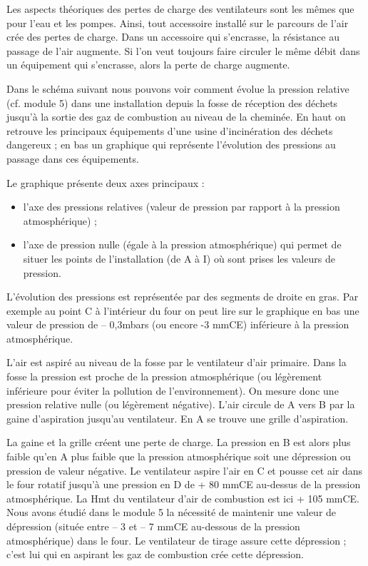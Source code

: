 Les aspects théoriques des pertes de charge des ventilateurs sont les mêmes que pour l’eau et les pompes. Ainsi, tout accessoire installé sur le parcours de l'air crée des pertes de charge.
Dans un accessoire qui s'encrasse, la résistance au passage de l'air augmente. Si l'on veut toujours faire circuler le même débit dans un équipement qui s'encrasse, alors la perte de charge augmente.
\vspace{0.3cm}

Dans le schéma suivant nous pouvons voir comment évolue la pression relative (cf. module 5) dans une installation depuis la fosse de réception des déchets jusqu'à la sortie des gaz de combustion au niveau de la cheminée.
En haut on retrouve les principaux équipements d'une usine d'incinération des déchets dangereux ; en bas un graphique qui représente l'évolution des pressions au passage dans ces équipements. 
\vspace{0.3cm}

Le graphique présente deux axes principaux :

\begin{itemize}
\item  l’axe des pressions relatives (valeur de pression par rapport à la pression atmosphérique) ;
\item  l’axe de pression nulle (égale à la pression atmosphérique) qui permet de situer les points de l'installation (de A à I) où sont prises les valeurs de pression.

\end{itemize}

L'évolution des pressions est représentée par des segments de droite en gras. Par exemple au point C à l'intérieur du four on peut lire sur le graphique en bas une valeur de pression de – 0,3mbars (ou encore -3 mmCE) inférieure à la pression atmosphérique.
\vspace{0.3cm}

L'air est aspiré au niveau de la fosse par le ventilateur d'air primaire. Dans la fosse la pression est proche de la pression atmosphérique (ou légèrement inférieure pour éviter la pollution de l'environnement). On mesure donc une pression relative nulle (ou légèrement négative).
L'air circule de A vers B par la gaine d'aspiration jusqu'au ventilateur. En A se trouve une grille d'aspiration.
\vspace{0.3cm}

La gaine et la grille créent une perte de charge. La pression en B est alors plus faible qu'en A plus faible que la pression atmosphérique soit une dépression ou pression de valeur négative.
Le ventilateur aspire l'air en C et pousse cet air dans le four rotatif jusqu'à une pression en D de + 80 mmCE au-dessus de la pression atmosphérique. La Hmt du ventilateur d’air de combustion est ici + 105 mmCE.
Nous avons étudié dans le module 5 la nécessité de maintenir une valeur de dépression (située entre – 3 et – 7 mmCE au-dessous de la pression atmosphérique) dans le four. Le ventilateur de tirage assure cette dépression ; c'est lui qui en aspirant les gaz de combustion crée cette dépression.
\vspace{0.3cm}

